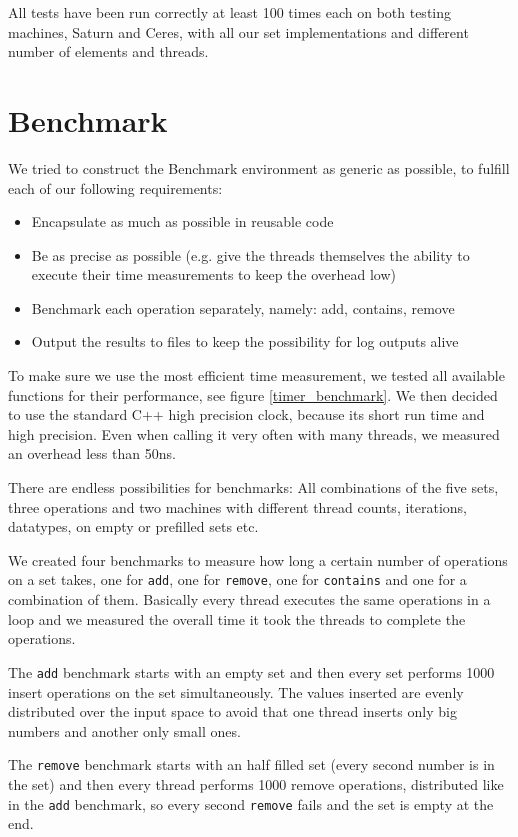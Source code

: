 All tests have been run correctly at least 100 times each on both testing machines, Saturn and Ceres, with all our set implementations and different number of elements and threads.
\section{Benchmark}
We tried to construct the Benchmark environment as generic as possible, to fulfill each of our following requirements:
\begin{itemize}
\item Encapsulate as much as possible in reusable code
\item Be as precise as possible (e.g. give the threads themselves the ability to execute their time measurements to keep the overhead low)
\item Benchmark each operation separately, namely: add, contains, remove
\item Output the results to files to keep the possibility for log outputs alive
\end{itemize}

To make sure we use the most efficient time measurement, we tested all available functions for their performance, see figure \ref{timer_benchmark}. We then decided to use the standard C++ high precision clock, because its short run time and high precision. Even when calling it very often with many threads, we measured an overhead less than 50ns.

There are endless possibilities for benchmarks: All combinations of the five sets, three operations and two machines with different thread counts, iterations, datatypes, on empty or prefilled sets etc.

We created four benchmarks to measure how long a certain number of operations on a set takes, one for \texttt{add}, one for \texttt{remove}, one for \texttt{contains} and one for a combination of them. Basically every thread executes the same operations in a loop and we measured the overall time it took the threads to complete the operations. 

The \texttt{add} benchmark starts with an empty set and then every set performs 1000 insert operations on the set simultaneously. The values inserted are evenly distributed over the input space to avoid that one thread inserts only big numbers and another only small ones.

The \texttt{remove} benchmark starts with an half filled set (every second number is in the set) and then every thread performs 1000 remove operations, distributed like in the \texttt{add} benchmark, so every second \texttt{remove} fails and the set is empty at the end.

